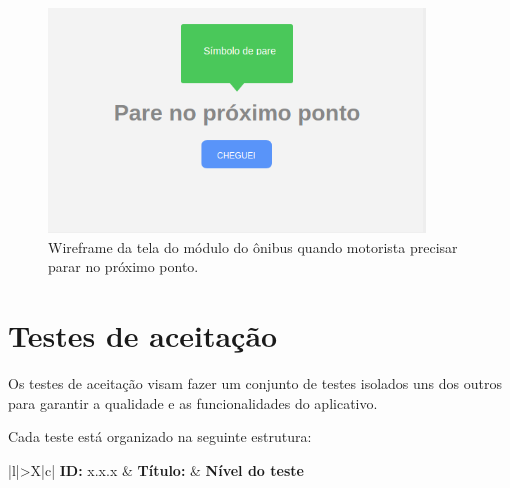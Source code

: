 \documentclass[
	12pt,				%
	oneside,			%
	a4paper,			%
	brazil				%
]{abntex2}
\begin{document}
\begin{apendicesenv}
\begin{figure}[!h]
\centering
\includegraphics[width=10cm, center]{images/busmodule-pare}
\caption{Wireframe da tela do módulo do ônibus quando motorista precisar parar no próximo ponto.}
\label{Rotulo}
\end{figure}

\chapter{Testes de aceitação}

Os testes de aceitação visam fazer um conjunto de testes isolados uns dos outros para garantir a qualidade e as funcionalidades do aplicativo.

Cada teste está organizado na seguinte estrutura:

\bgroup
\def\arraystretch{1.5}
\begin{table}[H]

\begin{tabularx}{\textwidth}{|l|>{\hsize}X|c|}
\hline 
\textbf{ID:} x.x.x & \textbf{Título:}  & \textbf{Nível do teste} \\ 
\hline 
{} \\ 
\hline  
{} \\ 
\hline 
{} \\ 
\hline 
{} \\ 
\hline 
{} \\ 
\hline 
\end{tabularx} 


\end{table}
\end{apendicesenv}
\end{document}
